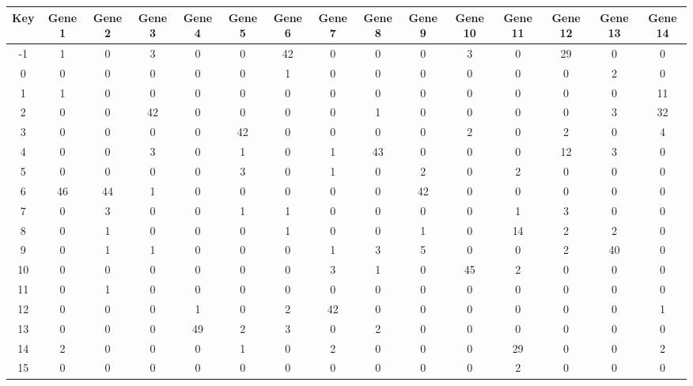 \begin{tabular}{|c|c|c|c|c|c|c|c|c|c|c|c|c|c|c|}
\hline
Key & Gene 1 & Gene 2 & Gene 3 & Gene 4 & Gene 5 & Gene 6 & Gene 7 & Gene 8 & Gene 9 & Gene 10 & Gene 11 & Gene 12 & Gene 13 & Gene 14 \\
\hline
-1 & 1 & 0 & 3 & 0 & 0 & 42 & 0 & 0 & 0 & 3 & 0 & 29 & 0 & 0 \\
0 & 0 & 0 & 0 & 0 & 0 & 1 & 0 & 0 & 0 & 0 & 0 & 0 & 2 & 0 \\
1 & 1 & 0 & 0 & 0 & 0 & 0 & 0 & 0 & 0 & 0 & 0 & 0 & 0 & 11 \\
2 & 0 & 0 & 42 & 0 & 0 & 0 & 0 & 1 & 0 & 0 & 0 & 0 & 3 & 32 \\
3 & 0 & 0 & 0 & 0 & 42 & 0 & 0 & 0 & 0 & 2 & 0 & 2 & 0 & 4 \\
4 & 0 & 0 & 3 & 0 & 1 & 0 & 1 & 43 & 0 & 0 & 0 & 12 & 3 & 0 \\
5 & 0 & 0 & 0 & 0 & 3 & 0 & 1 & 0 & 2 & 0 & 2 & 0 & 0 & 0 \\
6 & 46 & 44 & 1 & 0 & 0 & 0 & 0 & 0 & 42 & 0 & 0 & 0 & 0 & 0 \\
7 & 0 & 3 & 0 & 0 & 1 & 1 & 0 & 0 & 0 & 0 & 1 & 3 & 0 & 0 \\
8 & 0 & 1 & 0 & 0 & 0 & 1 & 0 & 0 & 1 & 0 & 14 & 2 & 2 & 0 \\
9 & 0 & 1 & 1 & 0 & 0 & 0 & 1 & 3 & 5 & 0 & 0 & 2 & 40 & 0 \\
10 & 0 & 0 & 0 & 0 & 0 & 0 & 3 & 1 & 0 & 45 & 2 & 0 & 0 & 0 \\
11 & 0 & 1 & 0 & 0 & 0 & 0 & 0 & 0 & 0 & 0 & 0 & 0 & 0 & 0 \\
12 & 0 & 0 & 0 & 1 & 0 & 2 & 42 & 0 & 0 & 0 & 0 & 0 & 0 & 1 \\
13 & 0 & 0 & 0 & 49 & 2 & 3 & 0 & 2 & 0 & 0 & 0 & 0 & 0 & 0 \\
14 & 2 & 0 & 0 & 0 & 1 & 0 & 2 & 0 & 0 & 0 & 29 & 0 & 0 & 2 \\
15 & 0 & 0 & 0 & 0 & 0 & 0 & 0 & 0 & 0 & 0 & 2 & 0 & 0 & 0 \\
\hline
\end{tabular}
